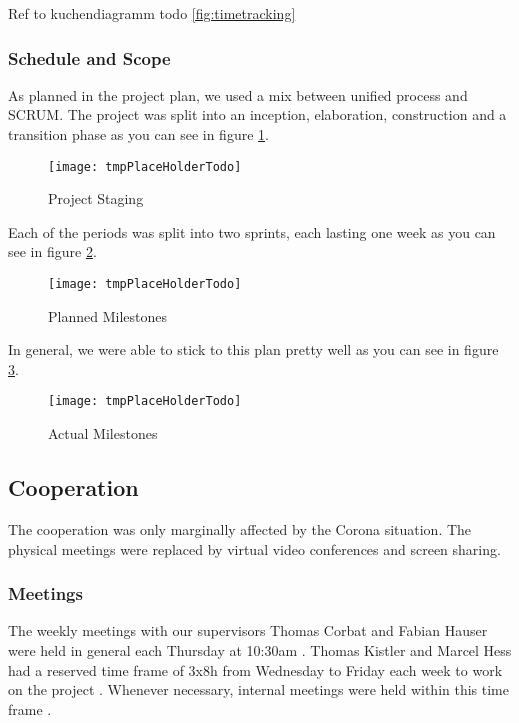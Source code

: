 Ref to kuchendiagramm todo \ref{fig:timetracking}

\subsubsection{Schedule and Scope}
As planned in the project plan, we used a mix between unified process and SCRUM.
The project was split into an inception, elaboration, construction and a transition phase
as you can see in figure \ref{fig:project_staging}.

\begin{figure}[H]
    \centering
    \texttt{[image: tmpPlaceHolderTodo]}
    \caption{Project Staging}
    \label{fig:project_staging}
\end{figure}

Each of the periods was split into two sprints, each lasting one week
as you can see in figure \ref{fig:planned_milestones}.

\begin{figure}[H]
    \centering
    \texttt{[image: tmpPlaceHolderTodo]}
    \caption{Planned Milestones}
    \label{fig:planned_milestones}
\end{figure}

In general, we were able to stick to this plan pretty well as you can see in figure \ref{fig:actual_milestones}.

\begin{figure}[H]
    \centering
    \texttt{[image: tmpPlaceHolderTodo]}
    \caption{Actual Milestones}
    \label{fig:actual_milestones}
\end{figure}

\subsection{Cooperation}
The cooperation was only marginally affected by the Corona situation.
The physical meetings were replaced by virtual video conferences and screen sharing.

\subsubsection{Meetings}
The weekly meetings with our supervisors Thomas Corbat and Fabian Hauser were held in general each Thursday at 10:30am \cite{projectplan}.
Thomas Kistler and Marcel Hess had a reserved time frame of 3x8h from Wednesday to
Friday each week to work on the project \cite{projectplan}.
Whenever necessary, internal meetings were held within this time frame \cite{projectplan}.

